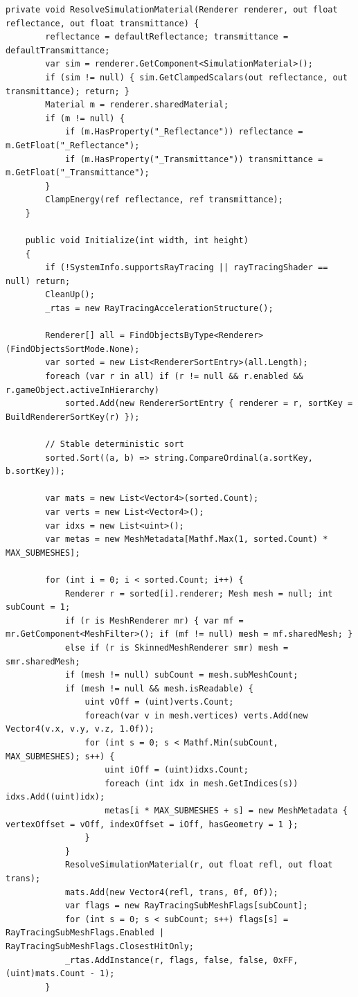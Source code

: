 \begin{lstlisting}[language={[Sharp]C}, caption={IrradianceBaker.cs: Orchestrates the hardware-accelerated DXR raytracing passes.}, label={lst:irradiancebaker}]
    private void ResolveSimulationMaterial(Renderer renderer, out float reflectance, out float transmittance) {
        reflectance = defaultReflectance; transmittance = defaultTransmittance;
        var sim = renderer.GetComponent<SimulationMaterial>();
        if (sim != null) { sim.GetClampedScalars(out reflectance, out transmittance); return; }
        Material m = renderer.sharedMaterial;
        if (m != null) {
            if (m.HasProperty("_Reflectance")) reflectance = m.GetFloat("_Reflectance");
            if (m.HasProperty("_Transmittance")) transmittance = m.GetFloat("_Transmittance");
        }
        ClampEnergy(ref reflectance, ref transmittance);
    }

    public void Initialize(int width, int height)
    {
        if (!SystemInfo.supportsRayTracing || rayTracingShader == null) return;
        CleanUp();
        _rtas = new RayTracingAccelerationStructure();

        Renderer[] all = FindObjectsByType<Renderer>(FindObjectsSortMode.None);
        var sorted = new List<RendererSortEntry>(all.Length);
        foreach (var r in all) if (r != null && r.enabled && r.gameObject.activeInHierarchy) 
            sorted.Add(new RendererSortEntry { renderer = r, sortKey = BuildRendererSortKey(r) });
        
        // Stable deterministic sort
        sorted.Sort((a, b) => string.CompareOrdinal(a.sortKey, b.sortKey));

        var mats = new List<Vector4>(sorted.Count);
        var verts = new List<Vector4>(); 
        var idxs = new List<uint>();
        var metas = new MeshMetadata[Mathf.Max(1, sorted.Count) * MAX_SUBMESHES];

        for (int i = 0; i < sorted.Count; i++) {
            Renderer r = sorted[i].renderer; Mesh mesh = null; int subCount = 1;
            if (r is MeshRenderer mr) { var mf = mr.GetComponent<MeshFilter>(); if (mf != null) mesh = mf.sharedMesh; }
            else if (r is SkinnedMeshRenderer smr) mesh = smr.sharedMesh;
            if (mesh != null) subCount = mesh.subMeshCount;
            if (mesh != null && mesh.isReadable) {
                uint vOff = (uint)verts.Count;
                foreach(var v in mesh.vertices) verts.Add(new Vector4(v.x, v.y, v.z, 1.0f));
                for (int s = 0; s < Mathf.Min(subCount, MAX_SUBMESHES); s++) {
                    uint iOff = (uint)idxs.Count;
                    foreach (int idx in mesh.GetIndices(s)) idxs.Add((uint)idx);
                    metas[i * MAX_SUBMESHES + s] = new MeshMetadata { vertexOffset = vOff, indexOffset = iOff, hasGeometry = 1 };
                }
            }
            ResolveSimulationMaterial(r, out float refl, out float trans);
            mats.Add(new Vector4(refl, trans, 0f, 0f));
            var flags = new RayTracingSubMeshFlags[subCount];
            for (int s = 0; s < subCount; s++) flags[s] = RayTracingSubMeshFlags.Enabled | RayTracingSubMeshFlags.ClosestHitOnly;
            _rtas.AddInstance(r, flags, false, false, 0xFF, (uint)mats.Count - 1);
        }


\end{lstlisting}
